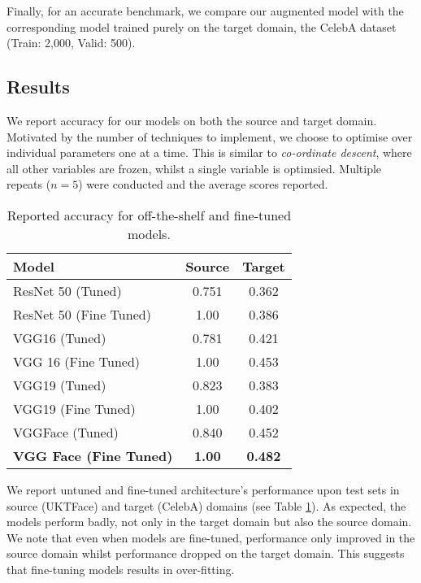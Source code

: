 \documentclass[10pt,twocolumn,letterpaper]{article}
\begin{document}

Finally, for an accurate benchmark, we compare our augmented model with the corresponding model trained purely on the target domain, the CelebA dataset (Train: 2,000, Valid: 500).

\subsection{Results}
We report accuracy for our models on both the source and target domain. Motivated by the number of techniques to implement, we choose to optimise over individual parameters one at a time. This is similar to \textit{co-ordinate descent}, where all other variables are frozen, whilst a single variable is optimsied. Multiple repeats ($n=5$) were conducted and the average scores reported.
\begin{table}[h!]
\begin{center}
\begin{tabular}{|l|c|c|}
\hline
Model & Source & Target \\\hline\hline
ResNet 50 (Tuned)&  0.751& 0.362\\
ResNet 50 (Fine Tuned) & 1.00 & 0.386\\ \hline
VGG16 (Tuned) & 0.781& 0.421\\
VGG 16 (Fine Tuned) & 1.00 & 0.453\\ \hline
VGG19 (Tuned) &0.823& 0.383\\
VGG19 (Fine Tuned) &1.00 & 0.402\\ \hline
VGGFace (Tuned)&0.840 & 0.452\\
\textbf{VGG Face (Fine Tuned)}& \textbf{1.00} & \textbf{0.482}\\ 
\hline
\end{tabular}
\end{center}
\caption{Reported accuracy for off-the-shelf and fine-tuned models. \label{finetuned}}
\end{table}

We report untuned and fine-tuned architecture's performance upon test sets in source (UKTFace) and target (CelebA) domains (see Table \ref{finetuned}). As expected, the models perform badly, not only in the target domain but also the source domain. We note that even when models are fine-tuned, performance only improved in the source domain whilst performance dropped on the target domain. This suggests that fine-tuning models results in over-fitting.
\end{document}
